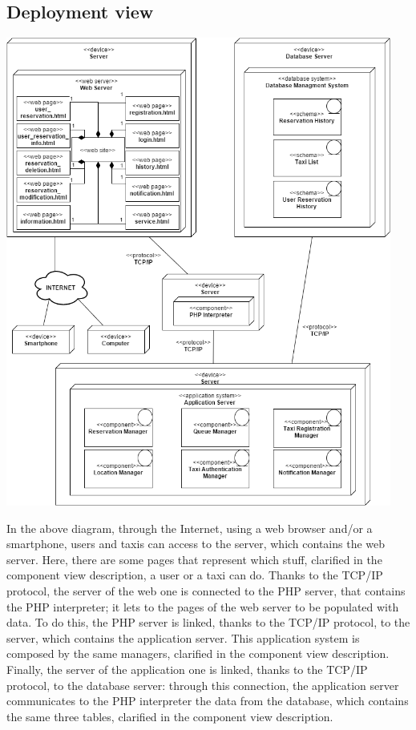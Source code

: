 \subsection{Deployment view}
	\begin{center}
		\includegraphics[width=0.95\textwidth]{./images/deployment_view.png}
	\end{center}
	
	In the above diagram, through the Internet, using a web browser and/or a smartphone, users and taxis can access to the server, which contains the web server. Here, there are some pages that represent which stuff, clarified in the component view description, a user or a taxi can do.
	Thanks to the TCP/IP protocol, the server of the web one is connected to the PHP server, that contains the PHP interpreter; it lets to the pages of the web server to be populated with data. To do this, the PHP server is linked, thanks to the TCP/IP protocol, to the server, which contains the application server. This application system is composed by the same managers, clarified in the component view description. 
	Finally, the server of the application one is linked, thanks to the TCP/IP protocol, to the database server: through this connection, the application server communicates to the PHP interpreter the data from the database, which contains the same three tables, clarified in the component view description. 
